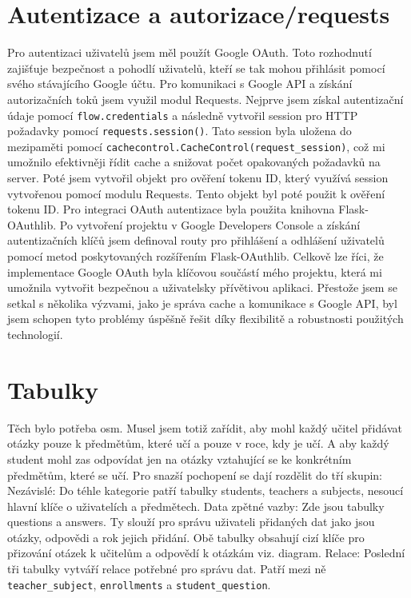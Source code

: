 \documentclass[11pt,a4paper,twoside,openright]{report}
\begin{document}
\section{Autentizace a autorizace/requests}

Pro autentizaci uživatelů jsem měl použít Google OAuth. Toto rozhodnutí zajišťuje bezpečnost a pohodlí uživatelů, kteří se tak mohou přihlásit pomocí svého stávajícího Google účtu.
Pro komunikaci s Google API a získání autorizačních toků jsem využil modul Requests. Nejprve jsem získal autentizační údaje pomocí \texttt{flow.credentials} a následně vytvořil session pro HTTP požadavky pomocí \texttt{requests.session()}. Tato session byla uložena do mezipaměti pomocí \texttt{cachecontrol.CacheControl(request\_session)}, což mi umožnilo efektivněji řídit cache a snižovat počet opakovaných požadavků na server.
Poté jsem vytvořil objekt pro ověření tokenu ID, který využívá session vytvořenou pomocí modulu Requests. Tento objekt byl poté použit k ověření tokenu ID.
Pro integraci OAuth autentizace byla použita knihovna Flask-OAuthlib. Po vytvoření projektu v Google Developers Console a získání autentizačních klíčů jsem definoval routy pro přihlášení a odhlášení uživatelů pomocí metod poskytovaných rozšířením Flask-OAuthlib.
Celkově lze říci, že implementace Google OAuth byla klíčovou součástí mého projektu, která mi umožnila vytvořit bezpečnou a uživatelsky přívětivou aplikaci. Přestože jsem se setkal s několika výzvami, jako je správa cache a komunikace s Google API, byl jsem schopen tyto problémy úspěšně řešit díky flexibilitě a robustnosti použitých technologií.

\section{Tabulky}

Těch bylo potřeba osm. Musel jsem totiž zařídit, aby mohl každý učitel přidávat otázky pouze k předmětům, které učí a pouze v roce, kdy je učí. A aby každý student mohl zas odpovídat jen na otázky vztahující se ke konkrétním předmětům, které se učí. Pro snazší pochopení se dají rozdělit do tří skupin:
	Nezávislé: Do téhle kategorie patří tabulky students, teachers a subjects, nesoucí hlavní klíče o uživatelích a předmětech. 
	Data zpětné vazby: Zde jsou tabulky questions a answers. Ty slouží pro správu uživateli přidaných dat jako jsou otázky, odpovědi a rok jejich přidání. Obě tabulky obsahují cizí klíče pro přizování otázek k učitelům a odpovědí k otázkám viz. diagram.
	Relace: Poslední tři tabulky vytváří relace potřebné pro správu dat. Patří mezi ně \texttt{teacher_subject}, \texttt{enrollments} a \texttt{student_question}.
\end{document}
